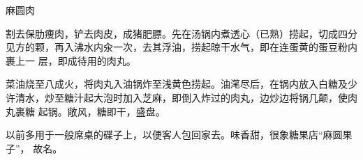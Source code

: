 %
%
%
%
%
%
%
\begin{recipe}{麻圆肉}

\ingredients


\preparation

\step 割去保肋痩肉，铲去肉皮，成猪肥膘。先在汤锅内煮透心（已熟）捞起，切成四分
见方的颗，再入沸水内汆一次，去其浮油，捞起晾干水气，即在连蛋黄的蛋豆粉内裹上一
层，即成待用的肉丸。

\step 菜油烧至八成火，将肉丸入油锅炸至浅黄色捞起。油滗尽后，在锅内放入白糖及少
许清水，炒至糖汁起大泡时加入芝麻，即倒入炸过的肉丸，边炒边将锅几颠，使肉丸裹糖
起锅。敞风，糖即干，盛盘。

\features

以前多用于一般席桌的碟子上，以便客人包回家去。味香甜，很象糖果店“麻圆果子”，
故名。

\end{recipe}

